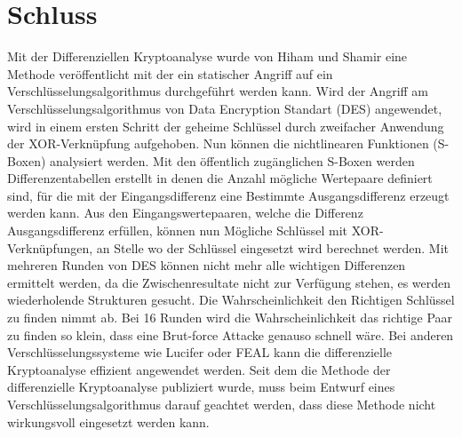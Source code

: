 \section{Schluss}\label{sec:Schluss}
Mit der Differenziellen Kryptoanalyse wurde von Hiham und Shamir eine Methode veröffentlicht mit der ein statischer Angriff auf ein Verschlüsselungsalgorithmus durchgeführt werden kann. Wird der Angriff am Verschlüsselungsalgorithmus von Data Encryption Standart (DES) angewendet, wird in einem ersten Schritt der geheime Schlüssel durch zweifacher Anwendung der XOR-Verknüpfung aufgehoben. Nun können die nichtlinearen Funktionen (S-Boxen) analysiert werden. Mit den öffentlich zugänglichen S-Boxen werden Differenzentabellen erstellt in denen die Anzahl mögliche Wertepaare definiert sind, für die mit der Eingangsdifferenz eine Bestimmte Ausgangsdifferenz erzeugt werden kann. Aus den Eingangswertepaaren, welche die Differenz Ausgangsdifferenz erfüllen, können nun Mögliche Schlüssel mit XOR-Verknüpfungen, an Stelle wo der Schlüssel eingesetzt wird berechnet werden. Mit mehreren Runden von DES können nicht mehr alle wichtigen Differenzen ermittelt werden, da die Zwischenresultate nicht zur Verfügung stehen, es werden wiederholende Strukturen gesucht. Die Wahrscheinlichkeit den Richtigen Schlüssel zu finden nimmt ab. Bei 16 Runden wird die Wahrscheinlichkeit das richtige Paar zu finden so klein, dass eine Brut-force Attacke genauso schnell wäre. Bei anderen Verschlüsselungssysteme wie Lucifer oder FEAL kann die differenzielle Kryptoanalyse effizient angewendet werden. Seit dem die Methode der differenzielle Kryptoanalyse publiziert wurde, muss beim Entwurf eines Verschlüsselungsalgorithmus darauf geachtet werden, dass diese Methode nicht wirkungsvoll eingesetzt werden kann.









